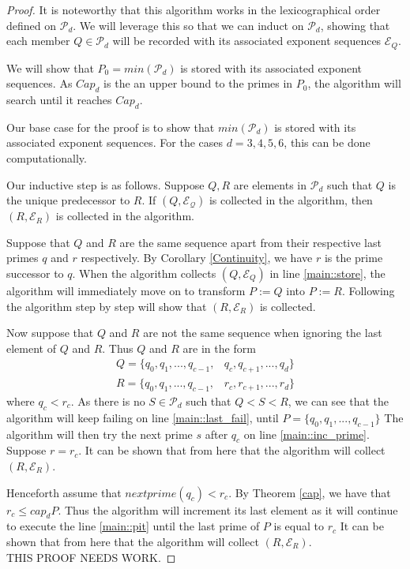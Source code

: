 \documentclass[../paper.tex]{subfiles}
\begin{document}
\begin{proof}
It is noteworthy that this algorithm works in the lexicographical
order defined on $\mathcal{P}_d$. We will leverage this so that we
can induct on $\mathcal{P}_d$, showing that each member $Q \in 
\mathcal{P}_d$ will be recorded with its associated exponent 
sequences $\mathcal{E}_Q$.


We will show that $P_0 = min(\mathcal{P}_d)$ is stored with its associated 
  exponent sequences. As $Cap_{d}$ is the an upper bound to the primes in $P_0$, the algorithm will search until it reaches $Cap_{d}$.


Our base case for the proof is to show that $min(\mathcal{P}_d)$
is stored with its associated exponent sequences. For the cases $d
= 3, 4, 5, 6$, this can be done computationally. 


Our inductive step is as follows. Suppose $Q, R$ are elements in 
$\mathcal{P}_d$ such that $Q$ is the unique predecessor to $R$. If
$(Q, \mathcal{E_Q})$ is collected in the algorithm, then $(R,
\mathcal{E}_R)$ is collected in the algorithm. 

Suppose that $Q$ and $R$ are the same sequence apart from 
their respective last primes $q$ and $r$ respectively. By Corollary 
\ref{Continuity}, we have $r$ is the prime successor to $q$. When 
the algorithm collects $(Q, \mathcal{E}_Q)$ in line \ref{main::store}, 
the algorithm will immediately move on to transform $P := Q$ into $P := R$.
Following the algorithm step by step will show that $(R, \mathcal{E}_R)$ 
is collected.

Now suppose that $Q$ and $R$ are not the same sequence when ignoring the 
last element of $Q$ and $R$. Thus $Q$ and $R$ are in the form 
\begin{equation}
\begin{split}
Q = \{q_0, q_1, ..., q_{c-1}, & q_c, q_{c+1}, ..., q_d\} \\
R = \{q_0, q_1, ..., q_{c-1}, & r_c, r_{c+1}, ..., r_d\}
\end{split}
\end{equation}
where $q_c < r_c$. As there is no $S \in \mathcal{P}_d$ such that
$Q < S < R$, we can see that the algorithm will keep failing on line
\ref{main::last_fail}, until $P = \{q_0, q_1, ..., q_{c-1}\}$
The algorithm will then try the next prime $s$ 
after $q_c$ on line \ref{main::inc_prime}. Suppose  $r = r_c$. It can
be shown that from here that the algorithm 
will collect $(R, \mathcal{E}_R)$.

Henceforth assume that $nextprime(q_c) < r_c$. By Theorem \ref{cap}, 
we have that $r_c \leq cap_d{P}$. Thus the algorithm will increment its last
element as it will continue to execute the line \ref{main::pit}  
until the last prime of $P$ is equal to $r_c$ It can
be shown that from here that the algorithm 
will collect $(R, \mathcal{E}_R)$.
\\

THIS PROOF NEEDS WORK.
\end{proof}
\end{document}
